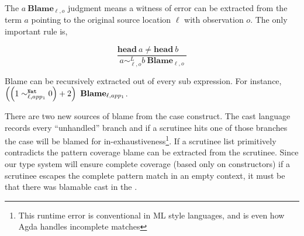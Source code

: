 The $a\ \mathbf{Blame}_{\ell,o}$ judgment means a witness of error can be extracted from the term $a$ pointing to the original source location $\ell$ with observation $o$.
The only important rule is,

\[
\frac{\mathbf{head}\ a\neq\mathbf{head}\ b\quad}{a\sim_{\ell,o}^{L}b\ \mathbf{Blame}_{\ell,o}}
\]

Blame can be recursively extracted out of every sub expression.
For instance, $\left(\left(1\sim_{\ell,app_{1}}^{\mathtt{Nat}{} }0\right)+2\right)\ \mathbf{Blame}_{\ell,app_{1}}$.

There are two new sources of blame from the case construct.
The cast language records every ``unhandled'' branch and if a scrutinee hits one of those branches the case will be blamed for in-exhaustiveness\footnote{
  This runtime error is conventional in ML style languages, and is even
how Agda handles incomplete matches }.
If a scrutinee list primitively contradicts the pattern coverage blame can be extracted from the scrutinee. 
Since our type system will ensure complete coverage (based only on constructors) if a scrutinee escapes the complete pattern match in an empty context, it must be that there was blamable cast in the \scrut.






